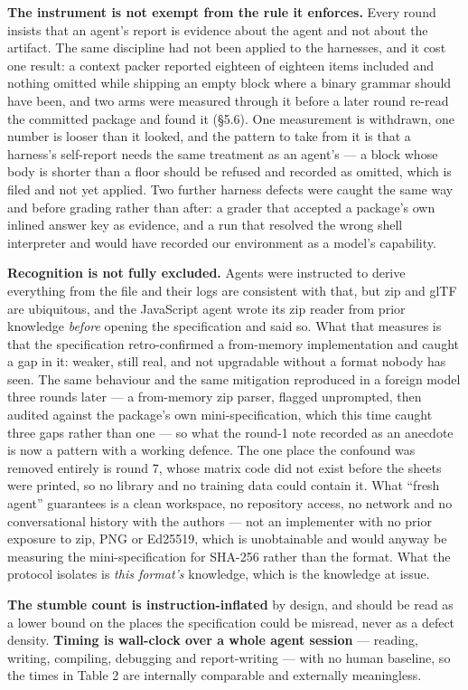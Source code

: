 \documentclass[10pt,twocolumn,letterpaper]{article}
\begin{document}
\textbf{The instrument is not exempt from the rule it enforces.} Every round insists that an agent's report is evidence about the agent and not about the artifact. The same discipline had not been applied to the harnesses, and it cost one result: a context packer reported eighteen of eighteen items included and nothing omitted while shipping an empty block where a binary grammar should have been, and two arms were measured through it before a later round re-read the committed package and found it (\S5.6). One measurement is withdrawn, one number is looser than it looked, and the pattern to take from it is that a harness's self-report needs the same treatment as an agent's --- a block whose body is shorter than a floor should be refused and recorded as omitted, which is filed and not yet applied. Two further harness defects were caught the same way and before grading rather than after: a grader that accepted a package's own inlined answer key as evidence, and a run that resolved the wrong shell interpreter and would have recorded our environment as a model's capability.

\textbf{Recognition is not fully excluded.} Agents were instructed to derive everything from the file and their logs are consistent with that, but zip and glTF are ubiquitous, and the JavaScript agent wrote its zip reader from prior knowledge \emph{before} opening the specification and said so. What that measures is that the specification retro-confirmed a from-memory implementation and caught a gap in it: weaker, still real, and not upgradable without a format nobody has seen. The same behaviour and the same mitigation reproduced in a foreign model three rounds later --- a from-memory zip parser, flagged unprompted, then audited against the package's own mini-specification, which this time caught three gaps rather than one --- so what the round-1 note recorded as an anecdote is now a pattern with a working defence. The one place the confound was removed entirely is round 7, whose matrix code did not exist before the sheets were printed, so no library and no training data could contain it. What ``fresh agent'' guarantees is a clean workspace, no repository access, no network and no conversational history with the authors --- not an implementer with no prior exposure to zip, PNG or Ed25519, which is unobtainable and would anyway be measuring the mini-specification for SHA-256 rather than the format. What the protocol isolates is \emph{this format's} knowledge, which is the knowledge at issue.

\textbf{The stumble count is instruction-inflated} by design, and should be read as a lower bound on the places the specification could be misread, never as a defect density. \textbf{Timing is wall-clock over a whole agent session} --- reading, writing, compiling, debugging and report-writing --- with no human baseline, so the times in Table 2 are internally comparable and externally meaningless.
\end{document}
